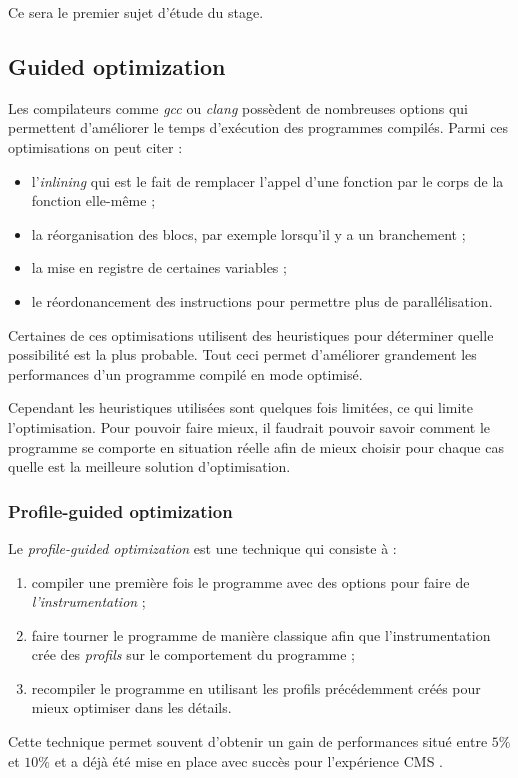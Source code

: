 \documentclass[a4paper,11pt]{report}
\begin{document}
\bigskip
Ce sera le premier sujet d'étude du stage.

\subsection{Guided optimization}
Les compilateurs comme \emph{gcc} ou \emph{clang} possèdent de nombreuses options qui permettent d'améliorer le temps d'exécution des programmes compilés.
Parmi ces optimisations on peut citer :
\begin{itemize}
    \item l'\emph{inlining} qui est le fait de remplacer l'appel d'une fonction par le corps de la fonction elle-même ;
    \item la réorganisation des blocs, par exemple lorsqu'il y a un branchement ;
    \item la mise en registre de certaines variables ;
    \item le réordonancement des instructions pour permettre plus de parallélisation.
\end{itemize}
Certaines de ces optimisations utilisent des heuristiques pour déterminer quelle possibilité est la plus probable.
Tout ceci permet d'améliorer grandement les performances d'un programme compilé en mode optimisé.

Cependant les heuristiques utilisées sont quelques fois limitées, ce qui limite l'optimisation.
Pour pouvoir faire mieux, il faudrait pouvoir savoir comment le programme se comporte en situation réelle afin de mieux choisir pour chaque cas quelle est la meilleure solution d'optimisation.

\subsubsection{Profile-guided optimization}
Le \emph{profile-guided optimization} est une technique qui consiste à :
\begin{enumerate}
    \item compiler une première fois le programme avec des options pour faire de \emph{l'instrumentation} ;
    \item faire tourner le programme de manière classique afin que l'instrumentation crée des \emph{profils} sur le comportement du programme ;
    \item recompiler le programme en utilisant les profils précédemment créés pour mieux optimiser dans les détails.
\end{enumerate}
Cette technique permet souvent d'obtenir un gain de performances situé entre $5\%$ et $10\%$ et a déjà été mise en place avec succès pour l'expérience CMS \cite{VIPGOforCMSReco}.
\end{document}
